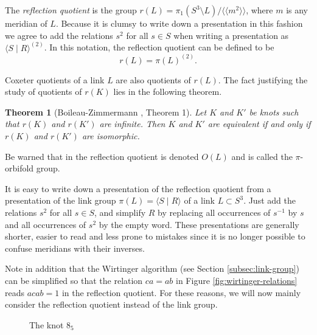 \documentclass{article}
\newtheorem{theorem}{Theorem}[section]
\theoremstyle{definition}
\begin{document}
The \textit{reflection quotient} is the group $r(L) = \pi_1(S^3 \setminus L) / \langle \langle m^2 \rangle \rangle$, where $m$ is any meridian of $L$. Because it is clumsy to write down a presentation in this fashion we agree to add the relations $s^2$ for all $s \in S$ when writing a presentation as $\langle S \; | \; R \rangle^{(2)}$. In this notation, the reflection quotient can be defined to be
$$r(L) = \pi(L)^{(2)}.$$

Coxeter quotients of a link $L$ are also quotients of $r(L)$. The fact justifying the study of quotients of $r(K)$ lies in the following theorem.

\begin{theorem}[Boileau-Zimmermann \cite{boileau1989}, Theorem 1]
Let $K$ and $K'$ be knots such that $r(K)$ and $r(K')$ are infinite. Then $K$ and $K'$ are equivalent if and only if $r(K)$ and $r(K')$ are isomorphic.
\end{theorem}

Be warned that in \cite{boileau1989} the reflection quotient is denoted $O(L)$ and is called the $\pi$-orbifold group.

It is easy to write down a presentation of the reflection quotient from a presentation of the link group $\pi(L) = \langle S \; | \; R \rangle$ of a link $L \subset S^3$. Just add the relations $s^2$ for all $s \in S$, and simplify $R$ by replacing all occurrences of $s^{-1}$ by $s$ and all occurrences of $s^2$ by the empty word. These presentations are generally shorter, easier to read and less prone to mistakes since it is no longer possible to confuse meridians with their inverses.

Note in addition that the Wirtinger algorithm (see Section \ref{subsec:link-group}) can be simplified so that the relation $ca = ab$ in Figure \ref{fig:wirtinger-relations} reads $acab = 1$ in the reflection quotient.
For these reasons, we will now mainly consider the reflection quotient instead of the link group.


\begin{figure}[ht]
\centering
{}
\caption{The knot $8_5$}
\label{fig:8-5}
\end{figure}
\end{document}
